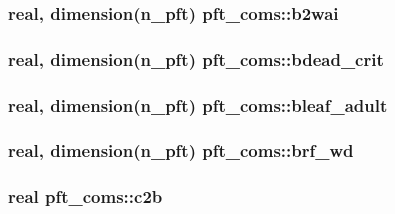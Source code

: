 \subsubsection[{\texorpdfstring{b2wai}{b2wai}}]{\setlength{\rightskip}{0pt plus 5cm}real, dimension(n\+\_\+pft) pft\+\_\+coms\+::b2wai}\hypertarget{namespacepft__coms_a31ab705538ba69a865a41647d0bd5d63}{}\label{namespacepft__coms_a31ab705538ba69a865a41647d0bd5d63}
\subsubsection[{\texorpdfstring{bdead\+\_\+crit}{bdead_crit}}]{\setlength{\rightskip}{0pt plus 5cm}real, dimension(n\+\_\+pft) pft\+\_\+coms\+::bdead\+\_\+crit}\hypertarget{namespacepft__coms_a321291df889682b63b1a09ff1affff18}{}\label{namespacepft__coms_a321291df889682b63b1a09ff1affff18}
\subsubsection[{\texorpdfstring{bleaf\+\_\+adult}{bleaf_adult}}]{\setlength{\rightskip}{0pt plus 5cm}real, dimension(n\+\_\+pft) pft\+\_\+coms\+::bleaf\+\_\+adult}\hypertarget{namespacepft__coms_a032c88698720a94f7bdeff271ae39844}{}\label{namespacepft__coms_a032c88698720a94f7bdeff271ae39844}
\subsubsection[{\texorpdfstring{brf\+\_\+wd}{brf_wd}}]{\setlength{\rightskip}{0pt plus 5cm}real, dimension(n\+\_\+pft) pft\+\_\+coms\+::brf\+\_\+wd}\hypertarget{namespacepft__coms_aad5b7cd93696f04e149139562ce0f7be}{}\label{namespacepft__coms_aad5b7cd93696f04e149139562ce0f7be}
\subsubsection[{\texorpdfstring{c2b}{c2b}}]{\setlength{\rightskip}{0pt plus 5cm}real pft\+\_\+coms\+::c2b}\hypertarget{namespacepft__coms_a2613e7dd1fa05af83d058d81f92946ec}{}\label{namespacepft__coms_a2613e7dd1fa05af83d058d81f92946ec}
